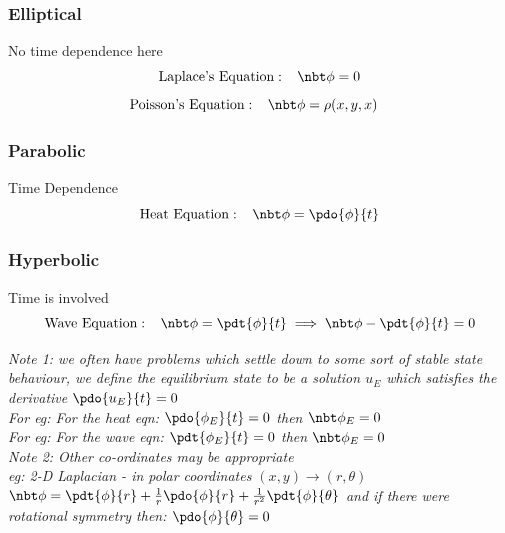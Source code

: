 \documentclass[11pt]{article}
\theoremstyle{definition}
\begin{document}
\subsubsection{Elliptical}
No time dependence here
$$\text{Laplace's Equation}:\;\;\; \nbt \phi = 0  $$
$$\text{Poisson's Equation}:\;\;\; \nbt \phi = \rho(x,y,x)  \;\;\; $$
\subsubsection{Parabolic}
Time Dependence
$$\text{Heat Equation}:\;\;\; \nbt \phi = \pdo{\phi}{t}$$
\subsubsection{Hyperbolic}
Time is involved
$$\text{Wave Equation}:\;\;\; \nbt \phi = \pdt{\phi}{t} \implies \nbt \phi - \pdt{\phi}{t} = 0$$

\textit{Note 1: we often have problems which settle down to some sort of stable state behaviour, we define the equilibrium state to be a solution $u_E$ which satisfies the derivative $\pdo{u_E}{t} = 0$\\
For eg: For the heat eqn:
$\pdo{\phi_E}{t} = 0$ then $\nbt \phi_E = 0$\\
For eg: For the wave eqn:\vspace{5mm}
$\pdt{\phi_E}{t} = 0$ then $\nbt \phi_E = 0$}\\

\textit{Note 2: Other co-ordinates may be appropriate\\
eg: 2-D Laplacian - in polar coordinates $(x,y) \rightarrow (r, \theta)$\\
$\nbt \phi = \pdt{\phi}{r} + \frac{1}{r} \pdo{\phi}{r} + \frac{1}{r^2} \pdt{\phi}{\theta}$ and if there were rotational symmetry then: $\pdo{\phi}{\theta} = 0$}
\end{document}
